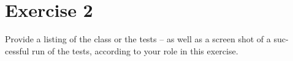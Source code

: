 \chapter{Exercise 2}

Provide a listing of the class or the tests – as well as a screen shot of a suc-
cessful run of the tests, according to your role in this exercise.